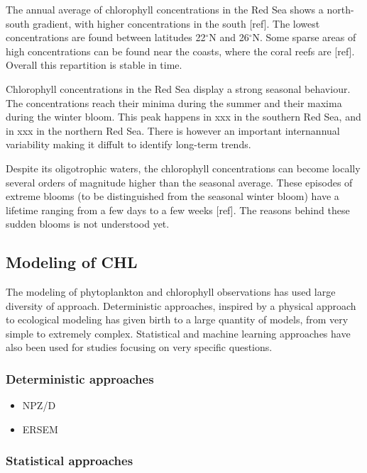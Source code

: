 			The annual average of chlorophyll concentrations in the Red Sea shows a north-south gradient, with higher concentrations in the south [ref]. The lowest concentrations are found between latitudes 22$^\circ$N and 26$^\circ$N. Some sparse areas of high concentrations can be found near the coasts, where the coral reefs are [ref]. Overall this repartition is stable in time. 

			Chlorophyll concentrations in the Red Sea display a strong seasonal behaviour. The concentrations reach their minima during the summer and their maxima during the winter bloom. This peak happens in xxx in the southern Red Sea, and in xxx in the northern Red Sea. There is however an important internannual variability making it diffult to identify long-term trends. 

			Despite its oligotrophic waters, the chlorophyll concentrations can become locally several orders of magnitude higher than the seasonal average. These episodes of extreme blooms (to be distinguished from the seasonal winter bloom) have a lifetime ranging from a few days to a few weeks [ref]. The reasons behind these sudden blooms is not understood yet. 

	\subsection{Modeling of CHL}
	\label{intro:context:modeling}

		The modeling of phytoplankton and chlorophyll observations has used large diversity of approach. Deterministic approaches, inspired by a physical approach to ecological modeling has given birth to a large quantity of models, from very simple to extremely complex. Statistical and machine learning approaches have also been used for studies focusing on very specific questions. 

		\subsubsection{Deterministic approaches}

			\begin{itemize}
				\item NPZ/D
				\item ERSEM
			\end{itemize}

		\subsubsection{Statistical approaches}

